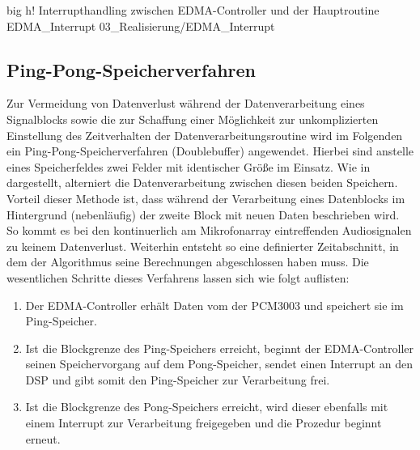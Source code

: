          {big}                                                       %
         {h!}                                                  %
         {Interrupthandling zwischen EDMA-Controller und der Hauptroutine}    %
         {EDMA_Interrupt}                                               %
         {03_Realisierung/EDMA_Interrupt}



\subsection{Ping-Pong-Speicherverfahren}
\label{subsec:PingPongSpeicherverfahren}
Zur Vermeidung von Datenverlust während der Datenverarbeitung eines Signalblocks sowie die zur Schaffung einer Möglichkeit zur unkomplizierten Einstellung des Zeitverhalten der Datenverarbeitungsroutine wird im Folgenden ein Ping-Pong-Speicherverfahren (Doublebuffer) angewendet. Hierbei sind anstelle eines Speicherfeldes zwei Felder mit identischer Größe im Einsatz. Wie in  dargestellt, alterniert die Datenverarbeitung zwischen diesen beiden Speichern. Vorteil dieser Methode ist, dass während der Verarbeitung eines Datenblocks im Hintergrund (nebenläufig) der zweite Block mit neuen Daten beschrieben wird. So kommt es bei den kontinuerlich am Mikrofonarray eintreffenden Audiosignalen zu keinem Datenverlust. Weiterhin entsteht so eine definierter Zeitabschnitt, in dem der Algorithmus seine Berechnungen abgeschlossen haben muss. Die wesentlichen Schritte dieses Verfahrens lassen sich wie folgt auflisten:


\begin{enumerate}
    \item Der EDMA-Controller erhält Daten vom der PCM3003 und speichert sie im Ping-Speicher.
    \item Ist die Blockgrenze des Ping-Speichers erreicht, beginnt der EDMA-Controller seinen Speichervorgang auf dem Pong-Speicher, sendet einen Interrupt an den DSP und gibt somit den Ping-Speicher zur Verarbeitung frei.
    \item Ist die Blockgrenze des Pong-Speichers erreicht, wird dieser ebenfalls mit einem Interrupt zur Verarbeitung freigegeben und die Prozedur beginnt erneut.
\end{enumerate}
 
